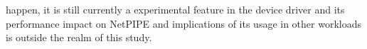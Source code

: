 happen, it is still currently a experimental feature in the device driver and its performance impact on NetPIPE and implications of its usage in other workloads is outside the realm of this study.









